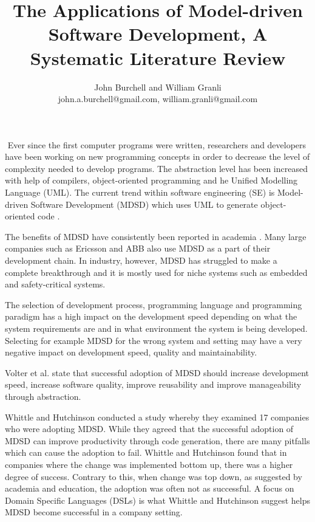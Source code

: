 \documentclass[10pt,twocolumn]{article}
\begin{document}
\title{The Applications of Model-driven Software Development, A Systematic Literature Review}

\author{John Burchell and William Granli \\
john.a.burchell@gmail.com, william.granli@gmail.com}


\maketitle
\thispagestyle{empty}




​
Ever since the first computer programs were written, researchers and developers have been working on new programming concepts in order to decrease the level of complexity needed to develop programs. The abstraction level has been increased with help of compilers, object-oriented programming and he Unified Modelling Language (UML). The current trend within software engineering (SE) is Model-driven Software Development (MDSD) which uses UML to generate object-oriented code \cite{staron2006adopting}. 

The benefits of MDSD have consistently been reported in academia \cite{staron2006adopting} \cite{volter2013model}. Many large companies such as Ericsson and ABB \cite{staron2006adopting} also use MDSD as a part of their development chain. In industry, however, MDSD has struggled to make a complete breakthrough and it is mostly used for niche systems such as embedded and safety-critical systems.


The selection of development process, programming language and programming paradigm has a high impact on the development speed depending on what the system requirements are and in what environment the system is being developed. Selecting for example MDSD for the wrong system and setting may have a very negative impact on development speed, quality and maintainability. 


Volter et al. \cite{volter2013model} state that successful adoption of MDSD should increase development speed, increase software quality, improve reusability and improve manageability through abstraction.

Whittle and Hutchinson \cite{whittle2012mismatches} conducted a study whereby they examined 17 companies who were adopting MDSD. While they agreed that the successful adoption of MDSD can improve productivity through code generation, there are many pitfalls which can cause the adoption to fail. Whittle and Hutchinson found that in companies where the change was implemented bottom up, there was a higher degree of success. Contrary to this, when change was top down, as suggested by academia and education, the adoption was often not as successful. A focus on Domain Specific Languages (DSLs) is what Whittle and Hutchinson suggest helps MDSD become successful in a company setting.
\end{document}
